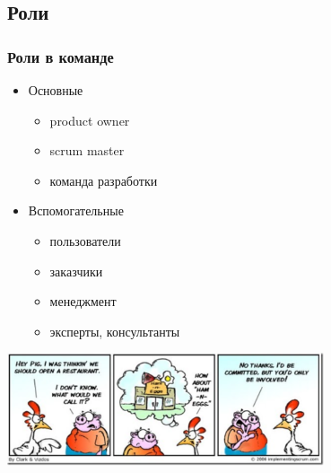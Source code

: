\documentclass[xetex,mathserif,serif]{beamer}
\begin{document}
    \subsection{Роли}

    \begin{frame}
        \frametitle{Роли в команде}
        \begin{itemize}
            \item Основные
            \begin{itemize}
                \item product owner
                \item scrum master
                \item команда разработки
            \end{itemize}
            \item Вспомогательные
            \begin{itemize}
                \item пользователи
                \item заказчики
                \item менеджмент
                \item эксперты, консультанты
            \end{itemize}
        \end{itemize}
        \begin{center}
            \includegraphics[width=0.7\textwidth]{ham-and-eggs.png}
        \end{center}
    \end{frame}
\end{document}
